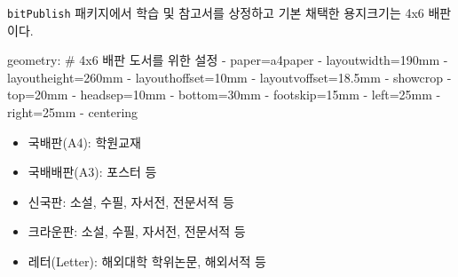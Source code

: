 \documentclass[
  letterpaper,
]{book}
\newenvironment{Shaded}{\begin{snugshade}}{\end{snugshade}}
\newcommand{\AttributeTok}[1]{\textcolor[rgb]{0.40,0.45,0.13}{#1}}
\newcommand{\CommentTok}[1]{\textcolor[rgb]{0.37,0.37,0.37}{#1}}
\newcommand{\FunctionTok}[1]{\textcolor[rgb]{0.28,0.35,0.67}{#1}}
\newcommand{\KeywordTok}[1]{\textcolor[rgb]{0.00,0.23,0.31}{#1}}
\providecommand{\tightlist}{%
  \setlength{\itemsep}{0pt}\setlength{\parskip}{0pt}}\usepackage{longtable,booktabs,array}
\begin{document}
\begin{tcolorbox}[enhanced jigsaw, opacityback=0, opacitybacktitle=0.6, colback=white, rightrule=.15mm, coltitle=black, colframe=quarto-callout-note-color-frame, colbacktitle=quarto-callout-note-color!10!white, bottomrule=.15mm, bottomtitle=1mm, breakable, title=\textcolor{quarto-callout-note-color}{\faInfo}\hspace{0.5em}{\(4\times6\) 배판}, titlerule=0mm, leftrule=.75mm, toptitle=1mm, left=2mm, arc=.35mm, toprule=.15mm]

\texttt{bitPublish} 패키지에서 학습 및 참고서를 상정하고 기본 채택한
용지크기는 4x6 배판이다.

\begin{Shaded}
\begin{Highlighting}[]
\AttributeTok{  }\FunctionTok{geometry}\KeywordTok{:}\CommentTok{       \# 4x6 배판 도서를 위한 설정}
\AttributeTok{    }\KeywordTok{{-}}\AttributeTok{ paper=a4paper}
\AttributeTok{    }\KeywordTok{{-}}\AttributeTok{ layoutwidth=190mm}
\AttributeTok{    }\KeywordTok{{-}}\AttributeTok{ layoutheight=260mm}
\AttributeTok{    }\KeywordTok{{-}}\AttributeTok{ layouthoffset=10mm}
\AttributeTok{    }\KeywordTok{{-}}\AttributeTok{ layoutvoffset=18.5mm}
\AttributeTok{    }\KeywordTok{{-}}\AttributeTok{ showcrop}
\AttributeTok{    }\KeywordTok{{-}}\AttributeTok{ top=20mm}
\AttributeTok{    }\KeywordTok{{-}}\AttributeTok{ headsep=10mm             }
\AttributeTok{    }\KeywordTok{{-}}\AttributeTok{ bottom=30mm}
\AttributeTok{    }\KeywordTok{{-}}\AttributeTok{ footskip=15mm                 }
\AttributeTok{    }\KeywordTok{{-}}\AttributeTok{ left=25mm}
\AttributeTok{    }\KeywordTok{{-}}\AttributeTok{ right=25mm}
\AttributeTok{    }\KeywordTok{{-}}\AttributeTok{ centering   }
\end{Highlighting}
\end{Shaded}

\begin{itemize}
\tightlist
\item
  국배판(A4): 학원교재
\item
  국배배판(A3): 포스터 등
\item
  신국판: 소설, 수필, 자서전, 전문서적 등
\item
  크라운판: 소설, 수필, 자서전, 전문서적 등
\item
  레터(Letter): 해외대학 학위논문, 해외서적 등
\end{itemize}

\end{tcolorbox}
\end{document}
